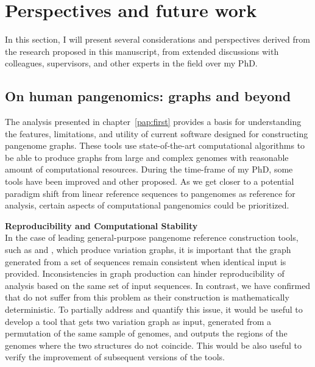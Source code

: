 
\chapter{Perspectives and future work}
\label{sec:perspectives}
In this section, I will present several considerations and perspectives derived from the research proposed in this manuscript, from extended discussions with colleagues, supervisors, and other experts in the field over my PhD.

\section{On human pangenomics: graphs and beyond}
The analysis presented in chapter~\ref{pap:first} provides a basis for understanding the features, limitations, and utility of current software designed for constructing pangenome graphs. These tools use state-of-the-art computational algorithms to be able to produce graphs from large and complex genomes with reasonable amount of computational resources. During the time-frame of my PhD, some tools have been improved and other proposed. As we get closer to a potential paradigm shift from linear reference sequences to pangenomes as reference for analysis, certain aspects of computational pangenomics could be prioritized. 


\textbf{Reproducibility and Computational Stability}\\
In the case of leading general-purpose pangenome reference construction tools, such as \pggb and \mcactus, which produce variation graphs, it is important that the graph generated from a set of sequences remain consistent when identical input is provided. Inconsistencies in graph production can hinder reproducibility of analysis based on the same set of input sequences. In contrast, we have confirmed that \dbgs do not suffer from this problem as their construction is mathematically deterministic. To partially address and quantify this issue, it would be useful to develop a tool that gets two variation graph as input, generated from a permutation of the same sample of genomes, and outputs the regions of the genomes where the two structures do not coincide. This would be also useful to verify the improvement of subsequent versions of the tools.


